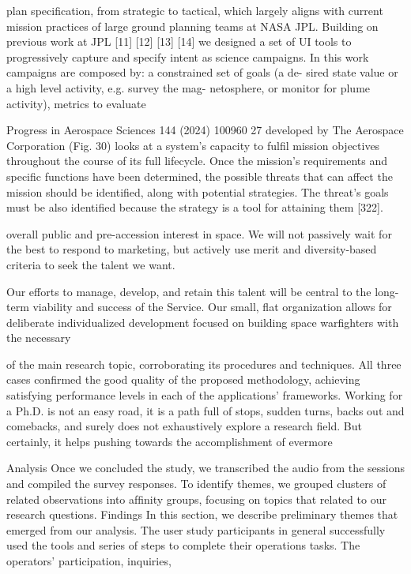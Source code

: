 \documentclass[a4paper,12pt]{article}
\begin{document}
plan speciﬁcation, from strategic to tactical, which largely
aligns with current mission practices of large ground planning
teams at NASA JPL. Building on previous work at JPL [11]
[12] [13] [14] we designed a set of UI tools to progressively
capture and specify intent as science campaigns. In this work
campaigns are composed by: a constrained set of goals (a de-
sired state value or a high level activity, e.g. survey the mag-
netosphere, or monitor for plume activity), metrics to evaluate

Progress in Aerospace Sciences 144 (2024) 100960
27
developed by The Aerospace Corporation (Fig. 30) looks at a system’s 
capacity to fulfil mission objectives throughout the course of its full 
lifecycle. Once the mission’s requirements and specific functions have 
been determined, the possible threats that can affect the mission should 
be identified, along with potential strategies. The threat’s goals must be 
also identified because the strategy is a tool for attaining them [322].

overall public and pre-accession interest in space. We will 
not passively wait for the best to respond to marketing, 
but actively use merit and diversity-based criteria to seek 
the talent we want. 
 
Our efforts to manage, develop, and retain this talent 
will be central to the long-term viability and success of 
the Service. Our small, flat organization allows for 
deliberate individualized development focused on 
building 
space 
warfighters 
with 
the 
necessary

of the main research topic, corroborating its procedures and techniques. All
three cases confirmed the good quality of the proposed methodology, achieving
satisfying performance levels in each of the applications’ frameworks.
Working for a Ph.D. is not an easy road, it is a path full of stops, sudden turns,
backs out and comebacks, and surely does not exhaustively explore a research
field. But certainly, it helps pushing towards the accomplishment of evermore

Analysis
Once we concluded the study, we transcribed the audio from
the sessions and compiled the survey responses. To identify
themes, we grouped clusters of related observations into
afﬁnity groups, focusing on topics that related to our research
questions.
Findings
In this section, we describe preliminary themes that emerged
from our analysis.
The user study participants in general
successfully used the tools and series of steps to complete
their operations tasks. The operators’ participation, inquiries,
\end{document}
